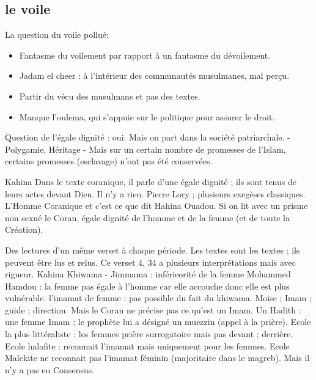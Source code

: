\subsection{le voile} \label{voile}
La question du voile pollué: 
\begin{itemize}
    \item 	Fantasme du voilement par rapport à un fantasme du dévoilement.
\item	Jadam el cheer : à l’intérieur des communautés musulmanes, mal perçu. 
\item	Partir du vécu des musulmans et pas des textes.
\item	Manque l’oulema, qui s’appuie sur le politique pour assurer le droit.
\end{itemize}

Question de l’égale dignité : oui. Mais on part dans la société patriarchale.
-	Polygamie, Héritage
-	Mais sur un certain nombre de promesses de l’Islam, certains promesses (esclavage) n’ont pas été conservées.

Kahina
Dans le texte coranique, il parle d’une égale dignité ; ils sont tenus de leurs actes devant Dieu. Il n’y a rien. Pierre Lory  ; plusieurs exegèses classiques. L’Homme Coranique et c’est ce que dit Hahina Ouadou. Si on lit avec un prisme non sexué le Coran, égale dignité de l’homme et de la femme (et de toute la Création). 

Des lectures d’un même verset à chaque période. Les textes sont les textes ; ils peuvent être lus et relus. Ce verset 4, 34 a plusieurs interprétations mais avec rigueur. 
Kahina
Khiwama - Jimmama  : inférieorité de la femme 
Mohammed Hamdou : la femme pas égale à l’homme car elle accouche donc elle est plus vulnérable. 
 l’imamat de femme : pas possible du fait du khiwama.
Moise : Imam ; guide ; direction. Mais le Coran ne précise pas ce qu’est un Imam.
Un Hadith : une femme Imam ; le prophète lui a désigné un muezzin (appel à la prière). 
Ecole la plus littéraliste : les femmes prière surrogatoire mais pas devant ; derrière.
Ecole halafite : reconnait l’imamat mais uniquement pour les femmes.
Ecole Malekite ne reconnait pas l’imamat féminin (majoritaire dans le magreb). Mais il n’y a pas eu Consensus.

